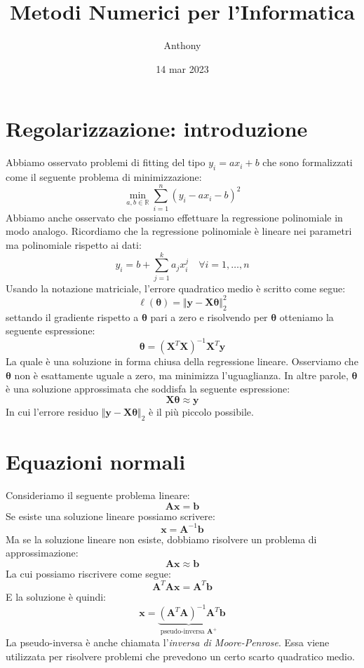 \documentclass{article}
\title{Metodi Numerici per l'Informatica}
\author{Anthony}
\date{14 mar 2023}
\begin{document}
    \maketitle

    \section{Regolarizzazione: introduzione}
        Abbiamo osservato problemi di fitting del tipo $y_i = ax_i + b$ che sono formalizzati come il seguente problema di minimizzazione:
        \[ \min_{a,b \in \mathbb{R}} \sum_{i=1}^n (y_i - ax_i - b)^2 \]
        Abbiamo anche osservato che possiamo effettuare la regressione polinomiale in modo analogo. Ricordiamo che la regressione polinomiale 
        è lineare nei parametri ma polinomiale rispetto ai dati:
        \[ y_i = b + \sum_{j=1}^k a_j x_i^j \quad \forall i = 1, \dots, n \]
        Usando la notazione matriciale, l'errore quadratico medio è scritto come segue:
        \[ \ell(\mathbf{\theta}) = \Vert \mathbf{y} - \mathbf{X\theta} \Vert_2^2 \]
        settando il gradiente rispetto a $\mathbf{\theta}$ pari a zero e risolvendo per $\mathbf{\theta}$ otteniamo la seguente 
        espressione:
        \[\mathbf{\theta} = (\mathbf{X}^T\mathbf{X})^{-1}\mathbf{X}^T\mathbf{y}\]
        La quale è una soluzione in forma chiusa della regressione lineare. Osserviamo che $\mathbf{\theta}$ non è esattamente uguale a zero, 
        ma minimizza l'uguaglianza. In altre parole, $\mathbf{\theta}$ è una soluzione approssimata che soddisfa la seguente espressione:
        \[\mathbf{X\theta} \approx \mathbf{y}\] 
        In cui l'errore residuo $\Vert \mathbf{y} - \mathbf{X\theta} \Vert_2$ è il più piccolo possibile.
    \section{Equazioni normali}
        Consideriamo il seguente problema lineare:
        \[\mathbf{Ax} = \mathbf{b}\]
        Se esiste una soluzione lineare possiamo scrivere:
        \[\mathbf{x} = \mathbf{A}^{-1}\mathbf{b}\]
        Ma se la soluzione lineare non esiste, dobbiamo risolvere un problema di approssimazione:
        \[\mathbf{Ax} \approx \mathbf{b} \]
        La cui possiamo riscrivere come segue:
        \[\mathbf{A}^T\mathbf{Ax} = \mathbf{A}^T\mathbf{b} \]
        E la soluzione è quindi:
        \[\mathbf{x} = \underbrace{(\mathbf{A}^T\mathbf{A})^{-1}\mathbf{A}^T}_{\text{pseudo-inversa } \mathbf{A}^+}\mathbf{b} \]
        La pseudo-inversa è anche chiamata l'\emph{inversa di Moore-Penrose}. Essa viene utilizzata per risolvere problemi che prevedono un 
        certo scarto quadratico medio.
\end{document}
